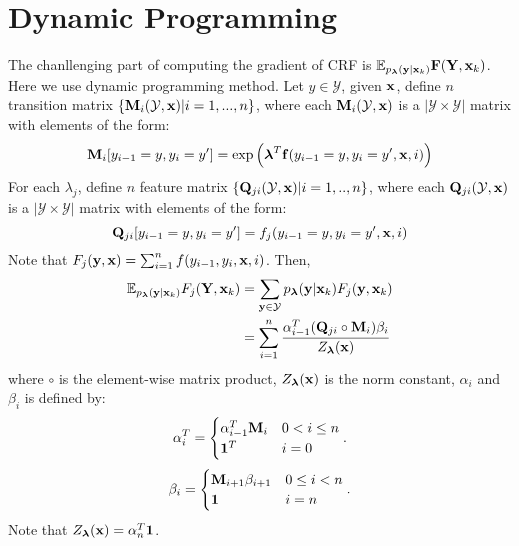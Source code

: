 \documentclass{amsart}
\theoremstyle{plain}
\theoremstyle{definition}
\theoremstyle{remark}
\numberwithin{equation}{section}
\newcommand{\bx}{{\bf x}}
\newcommand{\by}{{\bf y}}
\newcommand{\br}{\boldsymbol{\lambda}}
\begin{document}
\section{Dynamic Programming}
\noindent The chanllenging part of computing the gradient of CRF is 
$\mathbb{E}_{p_{\boldsymbol{\lambda}}({\bf y}|{\bf x}_k)}{\bf F}({\bf Y},{\bf x}_k)$. 
Here we use dynamic programming method.
\noindent Let $y\in \mathcal{Y}$, given $\bf x$, define $n$ transition matrix
$\{{\bf M}_i(\mathcal{Y},{\bf x})|i=1,...,n\}$, where each
${\bf M}_i(\mathcal{Y},\bf x)$ is a $|\mathcal{Y}\times\mathcal{Y}|$
matrix with elements of the form:
\[{\bf M}_i[y_{i-1}=y,y_i=y']=\exp\left({\boldsymbol\lambda}^T{\bf f}(y_{i-1}=y,y_i=y',{\bf x},i)\right)\]
\noindent For each $\lambda_j$, define $n$ feature matrix $\{{\bf Q}_{ji}(\mathcal{Y},{\bf x})|i=1,..,n\}$, 
where each ${\bf Q}_{ji}(\mathcal{Y},{\bf x})$ is a $|\mathcal{Y}\times\mathcal{Y}|$ 
matrix with elements of the form:
\[{\bf Q}_{ji}[y_{i-1}=y,y_i=y']=f_j(y_{i-1}=y,y_i=y',{\bf x},i)\]
Note that $F_j(\by,\bx)=\sum_{i=1}^n f(y_{i-1},y_i,\bx,i)$. Then,
\begin{align*}
\mathbb{E}_{p_{\br}(\by|\bx_k)}F_j({\bf Y},\bx_k)&=\sum_{\by\in\mathcal{Y}}p_{\br}(\by|\bx_k)F_j(\by,\bx_k)\\
&=\sum_{i=1}^n\frac{{\bf \alpha}_{i-1}^T({\bf Q}_{ji}\circ{\bf M}_i){\bf \beta}_i}{Z_{\br}(\bx)}
\end{align*}
where $\circ$ is the element-wise matrix product, $Z_{\br}(\bx)$
is the norm constant, $\alpha_i$ and $\beta_i$ is
defined by:
\begin{align}
\alpha_i^T = \begin{cases}
\alpha_{i-1}^T{\bf M}_i & 0< i \le n\\
{\bf 1}^T & i=0
\end{cases}. \notag
\end{align} 
\begin{align}
\beta_i = \begin{cases}
{\bf M}_{i+1}\beta_{i+1} & 0\le i < n\\
{\bf 1} & i=n
\end{cases}. \notag
\end{align}
Note that $Z_{\br}(\bx)=\alpha_n^T{\bf 1}$. 
{}
%
	
\end{document}

